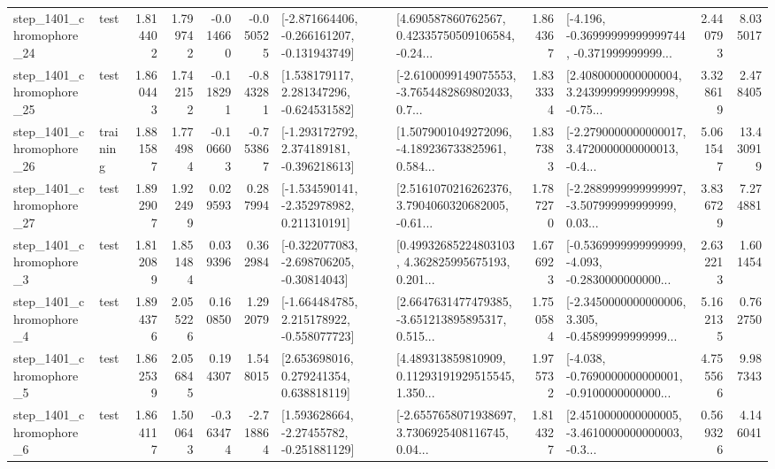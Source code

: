 \begin{tabular}{llrrrrllrlrr}
 step\_1401\_chromophore\_24 &      test &      1.814402 &    1.799742 &     -0.014660 & -0.050525 &  [-2.871664406, -0.266161207, -0.131943749] &  [4.690587860762567, 0.42335750509106584, -0.24... &       1.864367 &  [-4.196, -0.36999999999999744, -0.371999999999... &            2.440793 &          8.035017 \\
 step\_1401\_chromophore\_25 &      test &      1.860443 &    1.742152 &     -0.118291 & -0.843281 &    [1.538179117, 2.281347296, -0.624531582] &  [-2.6100099149075553, -3.7654482869802033, 0.7... &       1.833334 &  [2.4080000000000004, 3.2439999999999998, -0.75... &            3.328619 &          2.478405 \\
 step\_1401\_chromophore\_26 &  training &      1.881587 &    1.774984 &     -0.106603 & -0.753867 &   [-1.293172792, 2.374189181, -0.396218613] &  [1.5079001049272096, -4.189236733825961, 0.584... &       1.837383 &  [-2.2790000000000017, 3.4720000000000013, -0.4... &            5.061547 &         13.430919 \\
 step\_1401\_chromophore\_27 &      test &      1.892907 &    1.922499 &      0.029593 &  0.287994 &   [-1.534590141, -2.352978982, 0.211310191] &  [2.5161070216262376, 3.7904060320682005, -0.61... &       1.787270 &  [-2.2889999999999997, -3.507999999999999, 0.03... &            3.836729 &          7.274881 \\
  step\_1401\_chromophore\_3 &      test &      1.812089 &    1.851484 &      0.039396 &  0.362984 &   [-0.322077083, -2.698706205, -0.30814043] &  [0.49932685224803103, 4.362825995675193, 0.201... &       1.676923 &  [-0.5369999999999999, -4.093, -0.2830000000000... &            2.632213 &          1.601454 \\
  step\_1401\_chromophore\_4 &      test &      1.894376 &    2.055226 &      0.160850 &  1.292079 &   [-1.664484785, 2.215178922, -0.558077723] &  [2.6647631477479385, -3.651213895895317, 0.515... &       1.750584 &  [-2.3450000000000006, 3.305, -0.45899999999999... &            5.162135 &          0.762750 \\
  step\_1401\_chromophore\_5 &      test &      1.862539 &    2.056845 &      0.194307 &  1.548015 &     [2.653698016, 0.279241354, 0.638818119] &  [4.489313859810909, 0.11293191929515545, 1.350... &       1.975732 &  [-4.038, -0.7690000000000001, -0.9100000000000... &            4.755566 &          9.987343 \\
  step\_1401\_chromophore\_6 &      test &      1.864117 &    1.500643 &     -0.363474 & -2.718864 &    [1.593628664, -2.27455782, -0.251881129] &  [-2.6557658071938697, 3.7306925408116745, 0.04... &       1.814327 &  [2.4510000000000005, -3.4610000000000003, -0.3... &            0.569326 &          4.146041 \\

\end{tabular}
